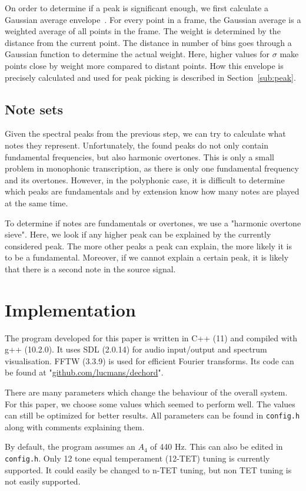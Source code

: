 \documentclass[10pt,twocolumn]{article}
\begin{document}
On order to determine if a peak is significant enough, we first calculate a Gaussian average envelope~\cite{gauss}. For every point in a frame, the Gaussian average is a weighted average of all points in the frame. The weight is determined by the distance from the current point. The distance in number of bins goes through a Gaussian function to determine the actual weight. Here, higher values for $\sigma$ make points close by weight more compared to distant points. How this envelope is precisely calculated and used for peak picking is described in Section~\ref{sub:peak}.

\subsection{Note sets}
Given the spectral peaks from the previous step, we can try to calculate what notes they represent. Unfortunately, the found peaks do not only contain fundamental frequencies, but also harmonic overtones. This is only a small problem in monophonic transcription, as there is only one fundamental frequency and its overtones. However, in the polyphonic case, it is difficult to determine which peaks are fundamentals and by extension know how many notes are played at the same time.

To determine if notes are fundamentals or overtones, we use a "harmonic overtone sieve". Here, we look if any higher peak can be explained by the currently considered peak. The more other peaks a peak can explain, the more likely it is to be a fundamental. Moreover, if we cannot explain a certain peak, it is likely that there is a second note in the source signal.


\section{Implementation}  \label{sec:impl}
The program developed for this paper is written in C++ (11) and compiled with g++ (10.2.0). It uses SDL (2.0.14) for audio input/output and spectrum visualisation. FFTW (3.3.9) is used for efficient Fourier transforms. Its code can be found at "\url{github.com/lucmans/dechord}".

There are many parameters which change the behaviour of the overall system. For this paper, we choose some values which seemed to perform well. The values can still be optimized for better results. All parameters can be found in \texttt{config.h} along with comments explaining them.

By default, the program assumes an $A_4$ of 440 Hz. This can also be edited in \texttt{config.h}. Only 12 tone equal temperament (12-TET) tuning is currently supported. It could easily be changed to n-TET tuning, but non TET tuning is not easily supported.
\end{document}
